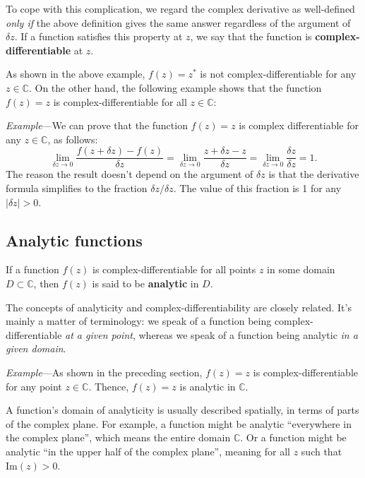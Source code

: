\documentclass[10pt,a4paper]{article}
\begin{document}
To cope with this complication, we regard the complex derivative as
well-defined \emph{only if} the above definition gives the same answer
regardless of the argument of $\delta z$. If a function satisfies this
property at $z$, we say that the function is
\textbf{complex-differentiable} at $z$.

As shown in the above example, $f(z) = z^*$ is not
complex-differentiable for any $z \in \mathbb{C}$. On the other hand,
the following example shows that the function $f(z) = z$ is
complex-differentiable for all $z \in \mathbb{C}$:

\begin{framed} \noindent
  \textit{Example}---We can prove that the function $f(z) = z$ is
  complex differentiable for any $z \in \mathbb{C}$, as
  follows:
\begin{equation}
  \lim_{\delta z \rightarrow0} \frac{f(z+\delta z) -
    f(z)}{\delta z} = \lim_{\delta z \rightarrow0} \frac{z+\delta z -
    z}{\delta z} = \lim_{\delta z \rightarrow0} \frac{\delta z}{\delta
    z} = 1.
\end{equation}
The reason the result doesn't depend on the argument of $\delta z$ is
that the derivative formula simplifies to the fraction $\delta z /
\delta z$. The value of this fraction is 1 for any $|\delta z| > 0$.
\end{framed}

\subsection{Analytic functions}\label{analytic-functions}

If a function $f(z)$ is complex-differentiable for all points $z$ in
some domain $D\subset \mathbb{C}$, then $f(z)$ is said to be
\textbf{analytic} in $D$.

The concepts of analyticity and complex-differentiability are closely
related. It's mainly a matter of terminology: we speak of a function
being complex-differentiable \emph{at a given point}, whereas we speak
of a function being analytic \emph{in a given domain}.

\begin{framed} \noindent
\textit{Example}---As shown in the preceding section, $f(z) = z$ is
complex-differentiable for any point $z \in \mathbb{C}$. Thence,
$f(z) = z$ is analytic in $\mathbb{C}$.
\end{framed}

A function's domain of analyticity is usually described spatially, in
terms of parts of the complex plane. For example, a function might be
analytic ``everywhere in the complex plane'', which means the entire
domain $\mathbb{C}$. Or a function might be analytic ``in the upper
half of the complex plane'', meaning for all $z$ such that
$\mathrm{Im}(z) > 0$.
\end{document}
